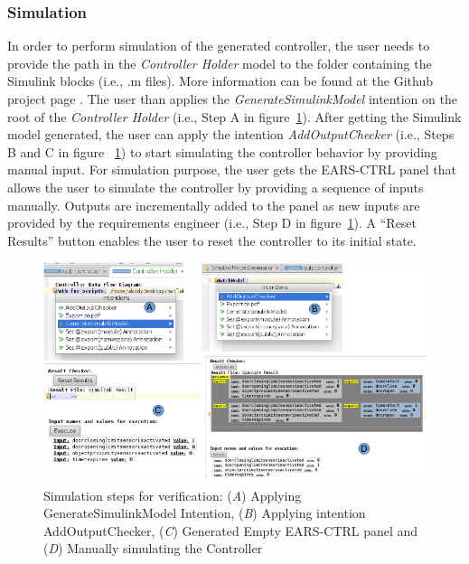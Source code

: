 \subsubsection{Simulation}
\vspace{-.2cm}
In order to perform simulation of the generated controller, the user needs to
provide the path in the \emph{Controller Holder} model to the folder containing
the Simulink blocks (i.e., .m files).
More information can be found at the Github project page \cite{EARSProject}. The
user than applies the \emph{GenerateSimulinkModel} intention on the root of the
\emph{Controller Holder} (i.e., Step A in figure~\ref{fig:SimulationSteps}).
After getting the Simulink model generated, the user can apply the intention
\emph{AddOutputChecker} (i.e., Steps B and C in figure
~\ref{fig:SimulationSteps}) to start simulating the controller behavior by
providing manual input. For simulation purpose, the user gets the
\textsf{EARS-CTRL} panel  that allows the user to simulate the controller by providing
a sequence of inputs manually.
Outputs are incrementally added to the panel as new inputs are provided by the
requirements engineer (i.e., Step D in figure~\ref{fig:SimulationSteps}).
A \textsf{“Reset Results”} button enables the user to reset the controller to
its initial state.
\begin{figure}[!h]
\centering
\includegraphics[width=1\textwidth]{./images/Simulation_Steps.png}
\caption{Simulation steps for verification: (\emph{A}) Applying
GenerateSimulinkModel Intention, (\emph{B}) Applying intention AddOutputChecker,
(\emph{C}) Generated Empty \textsf{EARS-CTRL} panel and (\emph{D}) Manually
simulating the Controller}
\label{fig:SimulationSteps}
\end{figure}
\vspace{-.3cm}
